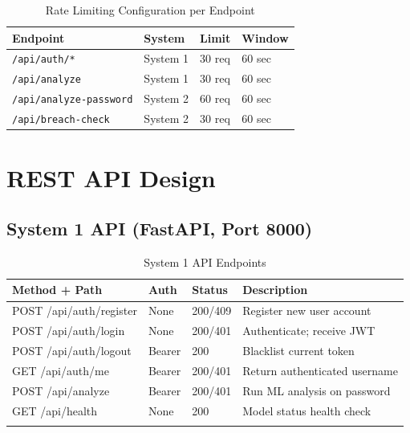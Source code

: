\documentclass[12pt,a4paper]{article}
\begin{document}
\begin{table}[H]
\centering
\begin{tabular}{llll}
\toprule
\textbf{Endpoint} & \textbf{System} & \textbf{Limit} & \textbf{Window} \\
\midrule
\texttt{/api/auth/*}                & System 1 & 30 req & 60 sec \\
\texttt{/api/analyze}               & System 1 & 30 req & 60 sec \\
\texttt{/api/analyze-password}      & System 2 & 60 req & 60 sec \\
\texttt{/api/breach-check}          & System 2 & 30 req & 60 sec \\
\bottomrule
\end{tabular}
\caption{Rate Limiting Configuration per Endpoint}
\end{table}

\section{REST API Design}

\subsection{System 1 API (FastAPI, Port 8000)}

\begin{longtable}{>{\ttfamily}lllp{4.5cm}}
\toprule
\textbf{Method + Path} & \textbf{Auth} & \textbf{Status} & \textbf{Description} \\
\midrule
\endhead

POST /api/auth/register & None     & 200/409 & Register new user account \\
POST /api/auth/login    & None     & 200/401 & Authenticate; receive JWT \\
POST /api/auth/logout   & Bearer   & 200     & Blacklist current token \\
GET  /api/auth/me       & Bearer   & 200/401 & Return authenticated username \\
POST /api/analyze       & Bearer   & 200/401 & Run ML analysis on password \\
GET  /api/health        & None     & 200     & Model status health check \\

\bottomrule
\caption{System 1 API Endpoints}
\end{longtable}
\end{document}
